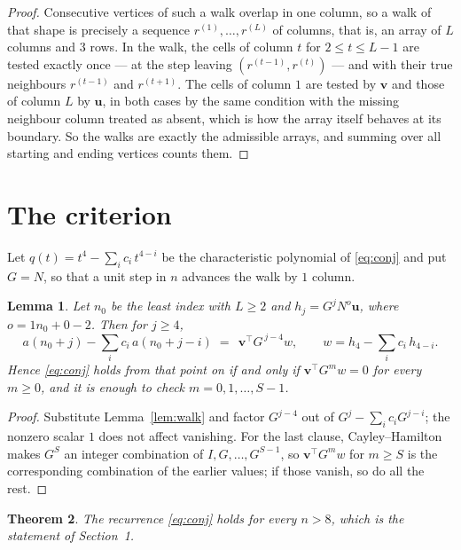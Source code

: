 \documentclass[11pt,a4paper]{article}
\theoremstyle{plain}
\newtheorem{theorem}{Theorem}
\newtheorem{lemma}[theorem]{Lemma}
\theoremstyle{definition}
\begin{document}
\begin{proof}
Consecutive vertices of such a walk overlap in one column, so a walk of that shape is
precisely a sequence $r^{(1)},\dots,r^{(L)}$ of columns, that is, an array of $L$ columns
and $3$ rows. In the walk, the cells of column $t$ for $2\le t\le L-1$ are tested
exactly once --- at the step leaving $(r^{(t-1)},r^{(t)})$ --- and with their true
neighbours $r^{(t-1)}$ and $r^{(t+1)}$. The cells of column $1$ are tested by
$\mathbf{v}$ and those of column $L$ by $\mathbf{u}$, in both cases by the same condition
with the missing neighbour column treated as absent, which is how the array itself behaves at
its boundary. So the walks are exactly the admissible arrays, and summing over all starting
and ending vertices counts them.
\end{proof}

\section{The criterion}

Let $q(t)=t^{4}-\sum_i c_i\,t^{4-i}$ be the characteristic polynomial of
\eqref{eq:conj} and put $G=N$, so that a unit step in $n$ advances the walk by
$1$ column.

\begin{lemma}\label{lem:crit}
Let $n_0$ be the least index with $L\ge2$ and $h_j=G^{j}N^{o}\mathbf{u}$, where
$o=1n_0+0-2$. Then for $j\ge4$,
\[
a(n_0+j)-\sum_i c_i\,a(n_0+j-i)\;=\;\,\mathbf{v}^{\!\top}G^{\,j-4}w,
\qquad w=h_{4}-\sum_i c_i\,h_{4-i} .
\]
Hence \eqref{eq:conj} holds from that point on if and only if
$\mathbf{v}^{\!\top}G^{m}w=0$ for every $m\ge0$, and it is enough to check
$m=0,1,\dots,S-1$.
\end{lemma}

\begin{proof}
Substitute Lemma~\ref{lem:walk} and factor $G^{j-4}$ out of
$G^{j}-\sum_ic_iG^{j-i}$; the nonzero scalar $1$ does not affect
vanishing. For the last clause, Cayley--Hamilton makes $G^{S}$ an integer combination of
$I,G,\dots,G^{S-1}$, so $\mathbf{v}^{\!\top}G^{m}w$ for $m\ge S$ is the corresponding
combination of the earlier values; if those vanish, so do all the rest.
\end{proof}

\begin{theorem}
The recurrence \eqref{eq:conj} holds for every $n>8$, which is the statement of
Section~1.
\end{theorem}
\end{document}
